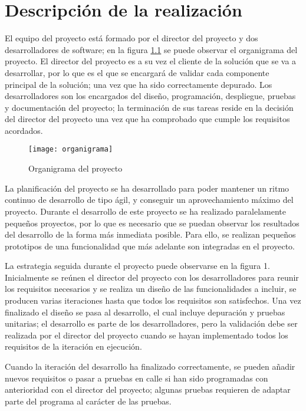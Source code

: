 \chapter{Descripción de la realización}
El equipo del proyecto está formado por el director del proyecto y dos desarrolladores de software; en la figura \ref{fig:organigrama} se puede observar el organigrama del proyecto. El director del proyecto es a su vez el cliente de la solución que se va a desarrollar, por lo que es el que se encargará de validar cada componente principal de la solución; una vez que ha sido correctamente depurado. Los desarrolladores son los encargados del diseño, programación, despliegue, pruebas y documentación del proyecto; la terminación de sus tareas reside en la decisión del director del proyecto una vez que ha comprobado que cumple los requisitos acordados.

\begin{figure}[H]
	\begin{center}
		\texttt{[image: organigrama]}
		\caption{Organigrama del proyecto}
		\label{fig:organigrama}
	\end{center}
\end{figure}

La planificación del proyecto se ha desarrollado para poder mantener un ritmo continuo de desarrollo de tipo ágil, y conseguir un aprovechamiento máximo del proyecto. Durante el desarrollo de este proyecto se ha realizado paralelamente pequeños proyectos, por lo que es  necesario que se puedan observar los resultados del desarrollo de la forma más inmediata posible. Para ello, se realizan pequeños prototipos de una funcionalidad que más adelante son integradas en el proyecto. 

La estrategia seguida durante el proyecto puede observarse en la figura 1. Inicialmente se reúnen el director del proyecto con los desarrolladores para reunir los requisitos necesarios y se realiza un diseño de las funcionalidades a incluir, se producen varias iteraciones hasta que todos los requisitos son satisfechos. Una vez finalizado el diseño se pasa al desarrollo, el cual incluye depuración y pruebas unitarias; el desarrollo es parte de los desarrolladores, pero la validación debe ser realizada por el director del proyecto cuando se hayan implementado todos los requisitos de la iteración en ejecución. 

Cuando la iteración del desarrollo ha finalizado correctamente, se pueden añadir nuevos requisitos o pasar a pruebas en calle si han sido programadas con anterioridad con el director del proyecto; algunas pruebas requieren de adaptar parte del programa al carácter de las pruebas. 

